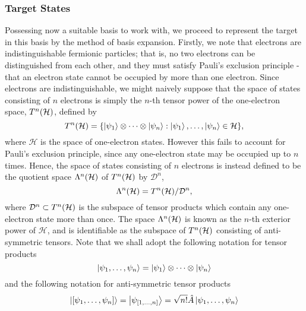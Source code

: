 \documentclass[draft]{article}
\begin{document}
\subsubsection{Target States}
\label{sec:target-states}

Possessing now a suitable basis to work with, we proceed to represent the
target in this basis by the method of basis expansion.
Firstly, we note that electrons are indistinguishable fermionic particles; that
is, no two electrons can be distinguished from each other, and they must satisfy
Pauli's exclusion principle - that an electron state cannot be occupied by more
than one electron.
Since electrons are indistinguishable, we might naively suppose that the space
of states consisting of $n$ electrons is simply the $n$-th tensor power of the
one-electron space, $T^{n}(\mathcal{H})$, defined by
\begin{equation}
  \label{eq:tensor-power}
  T^{n}(\mathcal{H})
  =
  \lbrace
    \ket{\psi_{1}}
    \otimes
    \dots
    \otimes
    \ket{\psi_{n}}
    :
    \ket{\psi_{1}},
    \dotsc,
    \ket{\psi_{n}}
    \in \mathcal{H}
  \rbrace
  ,
\end{equation}
where $\mathcal{H}$ is the space of one-electron states.
However this fails to account for Pauli's exclusion principle, since any
one-electron state may be occupied up to $n$ times.
Hence, the space of states consisting of $n$ electrons is instead defined to be
the quotient space $\Lambda^{n}(\mathcal{H})$ of $T^{n}(\mathcal{H})$ by
$\mathcal{D}^{n}$,
\begin{equation}
  \label{eq:exterior-power}
  \Lambda^{n}(\mathcal{H})
  =
  T^{n}(\mathcal{H})
  /
  \mathcal{D}^{n}
  ,
\end{equation}
where $\mathcal{D}^{n} \subset T^{n}(\mathcal{H})$ is the subspace of tensor
products which contain any one-electron state more than once.
The space $\Lambda^{n}(\mathcal{H})$ is known as the $n$-th exterior power of
$\mathcal{H}$, and is identifiable as the subspace of $T^{n}(\mathcal{H})$
consisting of anti-symmetric tensors.
Note that we shall adopt the following notation for tensor products
\begin{equation}
  \label{eq:tensor-product-notation}
  \ket{\psi_{1}, \dotsc, \psi_{n}}
  =
  \ket{\psi_{1}}
  \otimes
  \dots
  \otimes
  \ket{\psi_{n}}
\end{equation}
and the following notation for anti-symmetric tensor products
\begin{equation}
  \label{eq:anti-symmetric-tensor-product-notation}
  \ket{[\psi_{1}, \dotsc, \psi_{n}]}
  =
  \ket{\psi_{[1, \dotsc, n]}}
  =
  \sqrt{n!}
  \hat{A}
  \ket{\psi_{1}, \dotsc, \psi_{n}}
\end{equation}
\end{document}
